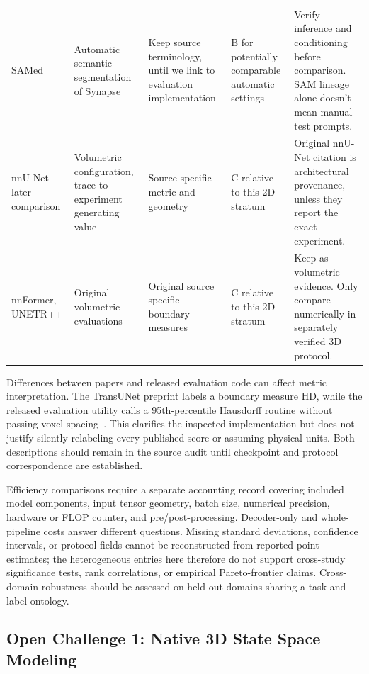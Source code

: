 \documentclass[5p,times,authoryear]{elsarticle}
\begin{document}
\begin{table}[t]
\begin{tabular}{>{\raggedright\arraybackslash}p{2.5cm}>{\raggedright\arraybackslash}p{2.9cm}>{\raggedright\arraybackslash}p{3.6cm}>{\raggedright\arraybackslash}p{3.0cm}>{\raggedright\arraybackslash}p{4.15cm}}
SAMed
& Automatic semantic segmentation of Synapse \citep{zhang2023samed}
& Keep source terminology, until we link to evaluation implementation
& B for potentially comparable automatic settings
& Verify inference and conditioning before comparison. SAM lineage alone doesn't mean manual test prompts. \\
nnU-Net later comparison
& Volumetric configuration, trace to experiment generating value \citep{isensee2021nnu}
& Source specific metric and geometry
& C relative to this 2D stratum
& Original nnU-Net citation is architectural provenance, unless they report the exact experiment. \\
nnFormer, UNETR++
& Original volumetric evaluations \citep{zhou2023nnformer,shaker2024unetrpp}
& Original source specific boundary measures
& C relative to this 2D stratum
& Keep as volumetric evidence. Only compare numerically in separately verified 3D protocol. \\
\bottomrule
\end{tabular}
\end{table}

Differences between papers and released evaluation code can affect metric interpretation. The TransUNet preprint labels a boundary measure HD, while the released evaluation utility calls a 95th-percentile Hausdorff routine without passing voxel spacing~\citep{chen2021transunet,transunet_code_verified}. This clarifies the inspected implementation but does not justify silently relabeling every published score or assuming physical units. Both descriptions should remain in the source audit until checkpoint and protocol correspondence are established.

Efficiency comparisons require a separate accounting record covering included model components, input tensor geometry, batch size, numerical precision, hardware or FLOP counter, and pre/post-processing. Decoder-only and whole-pipeline costs answer different questions. Missing standard deviations, confidence intervals, or protocol fields cannot be reconstructed from reported point estimates; the heterogeneous entries here therefore do not support cross-study significance tests, rank correlations, or empirical Pareto-frontier claims. Cross-domain robustness should be assessed on held-out domains sharing a task and label ontology.

\subsection{Open Challenge 1: Native 3D State Space Modeling}
\label{subsec:native3d}
\end{document}
